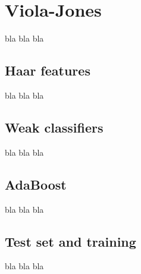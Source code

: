 \chapter{Viola-Jones}

\noindent bla bla bla
\newline

\section{Haar features}

\noindent bla bla bla
\newline

\section{Weak classifiers}

\noindent bla bla bla
\newline

\section{AdaBoost}

\noindent bla bla bla
\newline

\section{Test set and training}

\noindent bla bla bla
\newline